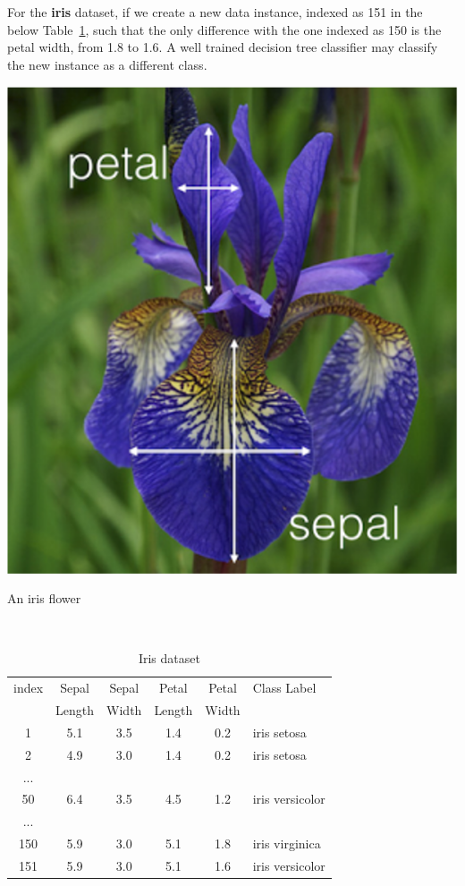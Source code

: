 For the \textbf{iris} dataset, if we create a new data instance, indexed as 151 in the below Table~\ref{tab:irisdatasetadv}, such that the only difference with the one indexed as 150 is the petal width, from 1.8 to 1.6. A well trained decision tree classifier may  classify the new instance  as a different class.  
\begin{table}[!htbp]
\center
\small
\begin{minipage}{0.3\textwidth}
    \centering
    \includegraphics[width=\textwidth]{images/foundations/iris.png}
    \caption{An iris flower}
    \label{fig:irisflowerexampleadv}
\end{minipage}~~~~~
\begin{minipage}{0.48\textwidth}
    \centering
    \begin{tabular}{|c|c|c|c|c|l|}
    \hline
       index  & Sepal & Sepal & Petal & Petal & Class Label\\
         & Length & Width & Length & Width &  \\
         \hline
       1  & 5.1 & 3.5 & 1.4 & 0.2 & iris setosa \\
       2  & 4.9 & 3.0 & 1.4 & 0.2 & iris setosa \\
       ... &&&&& \\
       50  & 6.4 & 3.5 & 4.5 & 1.2 & iris versicolor \\
       ... &&&&&\\
       150  & 5.9 & 3.0 & 5.1 & {\color{red}1.8} & iris virginica \\
       151  & 5.9 & 3.0 & 5.1 & {\color{red}1.6} & {\color{red}iris versicolor} \\
       \hline
    \end{tabular}
    \caption{Iris dataset}
    \label{tab:irisdatasetadv}
\end{minipage}
\end{table}


